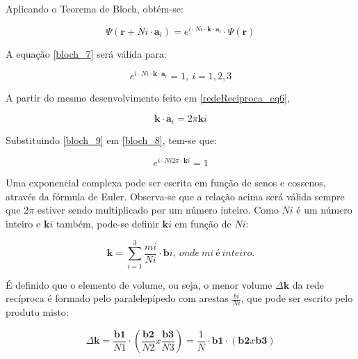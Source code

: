 		\par Aplicando o Teorema de Bloch, obtém-se:

		\begin{equation}
			\label{bloch_7}
			\Psi(\mathbf{r} + Ni \cdot \mathbf{a}_{i}) = e^{i\cdot N i \cdot \mathbf{k} \cdot \mathbf{a}_{i}} \cdot \Psi(\mathbf{r})
		\end{equation}

		\par A equação \eqref{bloch_7} será válida para:

		\begin{equation}
			\label{bloch_8}
			e^{i\cdot N i \cdot \mathbf{k} \cdot \mathbf{a}_{i}} = 1,\ i=1,2,3
		\end{equation}

		\par A partir do mesmo desenvolvimento feito em \eqref{redeReciproca_eq6},

		\begin{equation}
			\label{bloch_9}
			\mathbf{k} \cdot \mathbf{a}_{i} = 2 \pi \mathbf{k} i
		\end{equation}

		\par Substituindo \eqref{bloch_9} em \eqref{bloch_8}, tem-se que:

		\begin{equation}
			\label{bloch_10}
			e^{i\cdot N i 2 \pi \cdot \mathbf{k} i} = 1
		\end{equation}

		\par Uma exponencial complexa pode ser escrita em função de senos e cossenos, através da fórmula de Euler. Observa-se que a relação acima será válida sempre que $2\pi$ estiver sendo multiplicado por um número inteiro. Como $Ni$ é um número inteiro e $\mathbf{k}i$ também, pode-se definir $\mathbf{k}i$ em função de $Ni$:

		\begin{equation}
			\label{bloch_11}
			\mathbf{k} = \sum_{i=1}^3 \frac{mi}{Ni} \cdot \mathbf{b}i,\ onde\ mi\ é\ inteiro.
		\end{equation}

		\par É definido que o elemento de volume, ou seja, o menor volume $\Delta\mathbf{k}$ da rede recíproca é formado pelo paralelepípedo com arestas $\frac{bi}{Ni}$, que pode ser escrito pelo produto misto:

		\begin{equation}
			\label{bloch_12}
			\Delta \mathbf{k} = \frac{\mathbf{b1}}{N1} \cdot \left( \frac{\mathbf{b2}}{N2} x \frac{\mathbf{b3}}{N3} \right)
				= \frac{1}{N} \cdot \mathbf{b1} \cdot \left(\mathbf{b2} x \mathbf{b3}\right)
		\end{equation}

